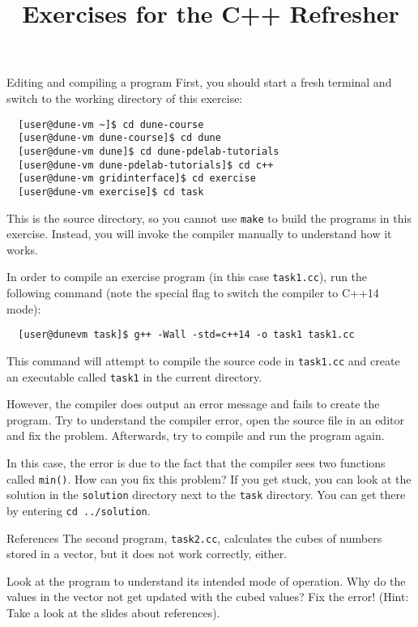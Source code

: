 \documentclass[12pt,a4paper]{article}
\title{\textbf{Exercises for the C++ Refresher}}
\begin{document}
\exerciseheader

\begin{Exercise}{Editing and compiling a program}
First, you should start a fresh terminal and switch to the working directory of this exercise:
\begin{lstlisting}
  [user@dune-vm ~]$ cd dune-course
  [user@dune-vm dune-course]$ cd dune
  [user@dune-vm dune]$ cd dune-pdelab-tutorials
  [user@dune-vm dune-pdelab-tutorials]$ cd c++
  [user@dune-vm gridinterface]$ cd exercise
  [user@dune-vm exercise]$ cd task
\end{lstlisting}

This is the source directory, so you cannot use \lstinline!make! to build the programs in this exercise.
Instead, you will invoke the compiler manually to understand how it works.

In order to compile an exercise program (in this case \lstinline!task1.cc!), run the following command (note
the special flag to switch the compiler to C++14 mode):

\begin{lstlisting}
  [user@dunevm task]$ g++ -Wall -std=c++14 -o task1 task1.cc
\end{lstlisting}

This command will attempt to compile the source code in \lstinline!task1.cc! and create an executable called \lstinline!task1! in the current directory.

However, the compiler does output an error message and fails to create the program. Try to understand the compiler error, open the source file in an editor and fix the problem. Afterwards, try to compile and run the program again.

In this case, the error is due to the fact that the compiler sees two functions called \texttt{min()}. How
can you fix this problem? If you get stuck, you can look at the solution in the \lstinline!solution! directory next to the \lstinline!task! directory. You can get there by entering \lstinline!cd ../solution!.

\end{Exercise}

\begin{Exercise}{References}
The second program, \lstinline!task2.cc!, calculates the cubes of numbers stored in a vector, but it does not
work correctly, either.

Look at the program to understand its intended mode of operation. Why do the values in the vector not get
updated with the cubed values? Fix the error! (Hint: Take a look at the slides about references).

\end{Exercise}
\end{document}
